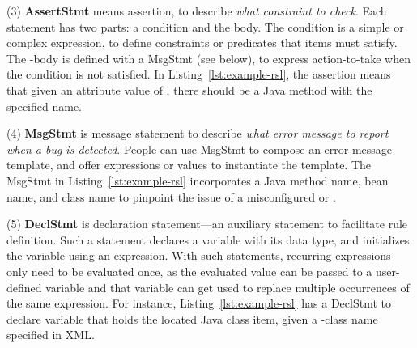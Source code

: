 (3) \textbf{AssertStmt} means assertion, to describe \emph{what constraint to check}. Each statement has two parts: a condition and the body. 
The condition is a simple or complex expression, to define constraints or predicates that items must satisfy. The -body is defined with a MsgStmt (see below), to express action-to-take when the condition is not satisfied.
In Listing~\ref{lst:example-rsl}, the assertion means that given an attribute value of , there should be a Java method with the specified name. 


 (4) \textbf{MsgStmt} is message statement to describe \emph{what error message to report when a bug is detected}. People can use MsgStmt to compose an error-message template, and offer expressions or values to instantiate the template. 
 The MsgStmt in Listing~\ref{lst:example-rsl} incorporates a Java method name, bean name, and class name to pinpoint the issue of 
 a misconfigured  or .

 (5) \textbf{DeclStmt} is declaration statement---an auxiliary statement to facilitate rule definition. Such a statement declares a variable with its data type, and initializes the variable using an expression. With such statements,
 recurring expressions only need to be evaluated once, as the evaluated value can be passed to a user-defined variable and that variable can get used to replace multiple occurrences of the same expression.
 For instance, Listing~\ref{lst:example-rsl} has a DeclStmt to declare variable  that 
 holds the located Java class item, given a -class name specified in XML. 

